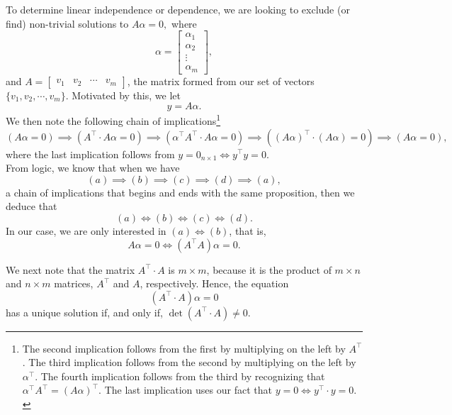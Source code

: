 To determine linear independence or dependence, we are looking to exclude (or find) non-trivial solutions to $A \alpha = 0,$
where $$\alpha= \left[\begin{array}{c} \alpha_1 \\ \alpha_2 \\ \vdots \\ \alpha_m \end{array} \right],  $$
and $A=\left[\begin{array}{cccc} v_1 & v_2 & \cdots & v_m \end{array} \right]$,
the matrix formed from our set of vectors $\{ v_1, v_2, \cdots, v_m\}$. Motivated by this, we let 
$$ y = A \alpha.$$
We then note the following chain of implications\footnote{The second implication follows from the first by multiplying on the left by $A^\top$. The third implication follows from the second by multiplying on the left by $\alpha^\top$. The fourth implication follows from the third by recognizing that $\alpha^\top  A^\top = (A \alpha)^\top$. The last implication uses our fact that $y=0 \iff y^\top \cdot y  = 0.$}
$$ \left( A \alpha = 0 \right) \implies  \left( A^\top \cdot A \alpha = 0 \right) \implies \left(\alpha^\top  A^\top \cdot A \alpha = 0 \right) \implies
\left( \left(  A \alpha \right)^\top \cdot \left(A \alpha\right) = 0 \right) \implies \left( A \alpha = 0 \right),$$
where the last implication follows from $y=0_{n \times 1} \iff y^\top y = 0.$\\

From logic, we know that when we have 
$$(a) \implies (b) \implies (c) \implies (d) \implies (a), $$
a chain of implications that begins and ends with the same proposition, then we deduce that 
$$ (a) \iff (b) \iff (c) \iff (d).$$
In our case, we are only interested in $(a) \iff (b)$, that is,
\begin{equation}
\label{eq:ProTipKeyEqn01}
 \boxed{ A \alpha = 0 \iff \left(A^\top A \right) \alpha = 0.}   
\end{equation}

We next note that the matrix $A^\top \cdot A $ is $m \times m$, because it is the product of $m \times n$ and $n \times m$ matrices, $A^\top$ and $A$, respectively. Hence, the equation
\begin{equation}
\label{eq:ProTipKeyEqn02}
    \left(A^\top \cdot A \right) \alpha = 0
\end{equation} 
has a unique solution if, and only if, $\det(A^\top \cdot A) \neq 0$.\\

